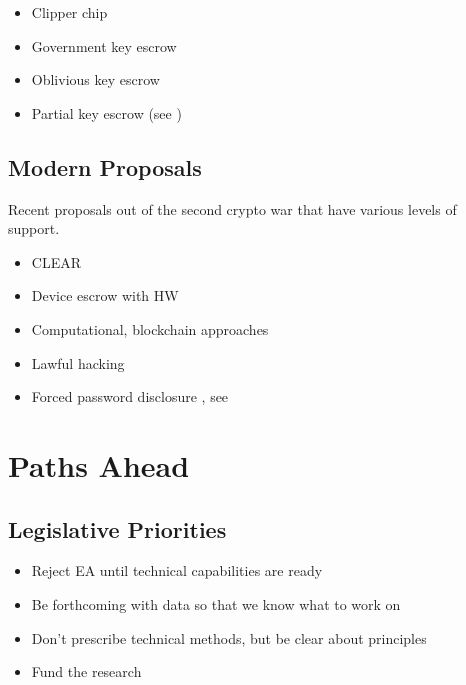 \begin{itemize}
    \item Clipper chip
    \item Government key escrow
    \item Oblivious key escrow \cite{goos_oblivious_1996}
    \item Partial key escrow (see \cite{denning_taxonomy_1996})
\end{itemize}

\subsection{Modern Proposals}

Recent proposals out of the second crypto war that have various levels of support.

\begin{itemize}
    \item CLEAR \cite{ozzie_2018}
    \item Device escrow with HW \cite{savage_lawful_2018}
    \item Computational, blockchain approaches \cite{phan_key_2017}
    \item Lawful hacking \cite{nguyen_lawful_2017} \cite{soesanto_2018}
    \item Forced password disclosure \cite{bittenbender_2019}, see \cite{kerr_encryption_2017}
\end{itemize}

\section{Paths Ahead}

\subsection{Legislative Priorities}

\begin{itemize}
    \item Reject EA until technical capabilities are ready \cite{varia_2018}
    \item Be forthcoming with data so that we know what to work on \cite{devlin_2018}
    \item Don't prescribe technical methods, but be clear about principles \cite{matyas_incommensurability_2018}
    \item Fund the research \cite{varia_2018}
\end{itemize}

